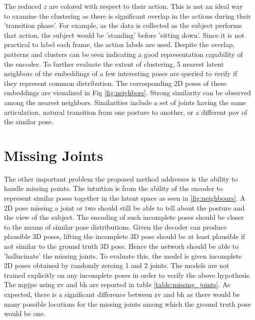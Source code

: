 The reduced $z$ are colored with respect to their action. This is not an ideal way to examine the clustering as there is significant overlap in the actions during their 'transition phase'. For example, as the data is collected as the subject performs that action, the subject would be 'standing' before 'sitting down'. Since it is not practical to label each frame, the action labels are used. Despite the overlap, patterns and clusters can be seen indicating a good representation capability of the encoder. To further evaluate the extent of clustering, 5 nearest latent neighbors of the embeddings of a few interesting poses are queried to verify if they represent common distribution. The corresponding 2D poses of these embeddings are visualized in Fig \ref{fig:neighbors}. Strong similarity can be observed among the nearest neighbors. Similarities include a set of joints having the same articulation, natural transition from one posture to another, or a different \ac{pov} of the similar pose. 




\section{Missing Joints}
The other important problem the proposed method addresses is the ability to handle missing points. The intuition is from the ability of the encoder to represent similar poses together in the latent space as seen in \ref{fig:neighbours}. A 2D pose missing a joint or two should still be able to tell about the posture and the view of the subject. The encoding of such incomplete poses should be closer to the means of similar pose distributions. Given the decoder can produce plausible 3D poses, lifting the incomplete 3D pose should be at least plausible if not similar to the ground truth 3D pose. Hence the network should be able to 'hallucinate' the missing joints. To evaluate this, the model is given incomplete 2D poses obtained by randomly zeroing 1 and 2 joints. The models are not trained explicitly on any incomplete poses in order to verify the above hypothesis. The \ac{mpjpe} using \ac{zv} and \ac{bh} are reported in table \ref{table:missing_joints}. As expected, there is a significant difference between \ac{zv} and \ac{bh} as there would be many possible locations for the missing joints among which the ground truth pose would be one.

